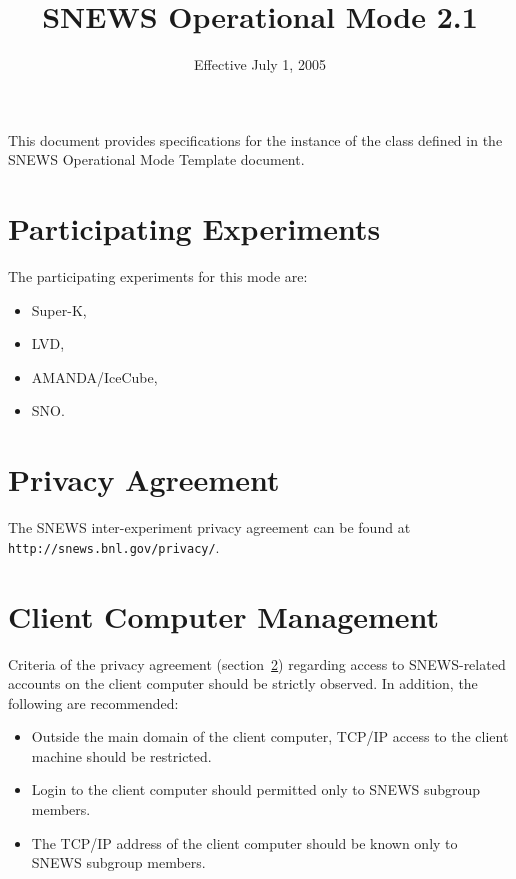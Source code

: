 \documentclass{article}
\begin{document}
\title{SNEWS Operational Mode 2.1}         
\date{Effective July 1, 2005}
\maketitle

This document provides specifications for the instance of
the class defined in the SNEWS Operational Mode Template document.


\section{Participating Experiments}

The participating experiments for this mode are:

\begin{itemize}
\item Super-K,
\item LVD,
\item AMANDA/IceCube,
\item SNO.
\end{itemize}

\section{Privacy Agreement}\label{privacy}

The SNEWS inter-experiment privacy agreement can be found at \\
{\tt http://snews.bnl.gov/privacy/}.

\section{Client Computer Management}

Criteria of the privacy agreement (section~\ref{privacy}) regarding
access to SNEWS-related accounts on the client computer should be
strictly observed. In addition, the following are recommended:

\begin{itemize}
\item Outside the main domain of the 
client computer, TCP/IP access to the client machine should be restricted.
\item Login to the client computer should permitted only to SNEWS subgroup 
members.
\item The TCP/IP address of the client computer should be known only to 
SNEWS subgroup members.
\end{itemize}
\end{document}
